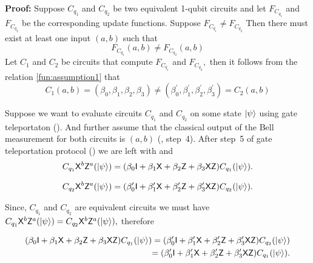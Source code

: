 {\bf Proof:}  Suppose $C_{q_1}$ and $C_{q_2}$ be two equivalent 1-qubit circuits and let $F_{C_{q_1}}$ and $F_{C_{q_2}}$ be the corresponding update functions. Suppose $F_{C_{q_1}}\neq F_{C_{q_2}}$ Then there must exist at least one input $(a,b)$ such that
\begin{equation}
\label{fun:assumption1}
F_{C_{q_1}}(a,b)\neq F_{C_{q_2}}(a,b)
\end{equation}
Let $C_1$ and $C_2$ be circuits that compute $F_{C_{q_1}}$ and $F_{C_{q_2}},$ then it follows from the relation \ref{fun:assumption1} that
\begin{equation*}
C_1(a,b)=(\beta_0, \beta_1, \beta_2 , \beta_3)\neq (\beta_0^\prime, \beta_1^\prime, \beta_2^\prime , \beta_3^\prime)=C_2(a,b)
\end{equation*}

Suppose we want to evaluate circuits $C_{q_1}$ and $C_{q_2}$ on some state ${\lvert}\psi\rangle$ using gate teleportaton (). And further assume that the classical output of the Bell measurement for both circuits is  $(a,b)$ (, step~4). After step~5 of  gate teleportation protocol () we are left with   and 
\begin{equation}
\label{lemma:1qubit:eq1}
\begin{aligned}
 C_{q_1} {\sf X}^b {\sf Z}^a({\lvert}\psi\rangle)=(\beta_0 {\sf I}+\beta_1 {\sf X}+\beta_2 {\sf Z}+\beta_3 {\sf X} {\sf Z})  C_{q_1} ({\lvert}\psi\rangle).\\
 \end{aligned}
\end{equation}

\begin{equation}
\label{lemma:1qubit:eq2}
\begin{aligned}
 C_{q_2}{\sf X}^b {\sf Z}^a({\lvert}\psi\rangle)=(\beta_0^\prime {\sf I}+\beta_1^\prime {\sf X}+\beta_2^\prime {\sf Z}+\beta_3^\prime {\sf X} {\sf Z})  C_{q_2}({\lvert}\psi\rangle).
 \end{aligned}
\end{equation}

Since, $C_{q_1}$ and $C_{q_2}$ are equivalent circuits we must have $C_{q_1} {\sf X}^b {\sf Z}^a({\lvert}\psi\rangle)=C_{q_2} {\sf X}^b {\sf Z}^a({\lvert}\psi\rangle),$ therefore

\begin{equation}
\label{lemma:1qubit:eq3}
\begin{aligned}
(\beta_0 {\sf I}+\beta_1 {\sf X}+\beta_2 {\sf Z}+\beta_3 {\sf X} {\sf Z})  C_{q_1} ({\lvert}\psi\rangle)=(\beta_0^\prime {\sf I}+\beta_1^\prime {\sf X}+\beta_2^\prime {\sf Z}+\beta_3^\prime {\sf X} {\sf Z})  C_{q_2} ({\lvert}\psi\rangle)\\
=(\beta_0^\prime {\sf I}+\beta_1^\prime {\sf X}+\beta_2^\prime {\sf Z}+\beta_3^\prime {\sf X} {\sf Z})  C_{q_1}({\lvert}\psi\rangle).\\
\end{aligned}
\end{equation}


